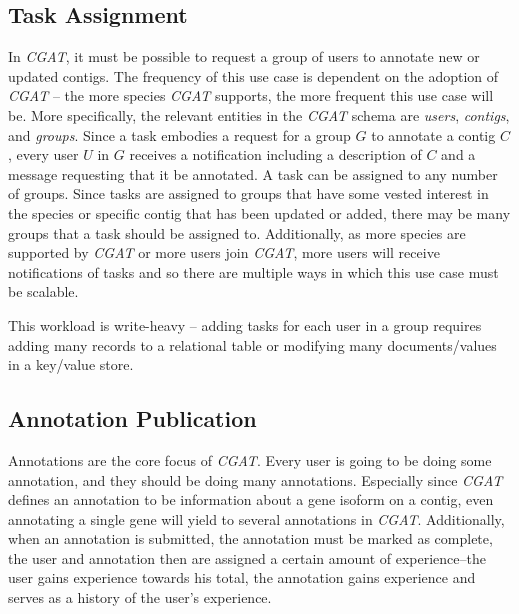 \documentclass[]{IEEEtran}
\begin{document}
\subsection{Task Assignment}
In \textit{CGAT}, it must be possible to request a group of users to annotate
new or updated contigs. The frequency of this use case is dependent on the
adoption of \textit{CGAT} -- the more species \textit{CGAT} supports, the more
frequent this use case will be. More specifically, the relevant entities in the
\textit{CGAT} schema are \textit{users}, \textit{contigs}, and \textit{groups}.
Since a task embodies a request for a group $G$ to annotate a contig $C$, every
user $U$ in $G$ receives a notification including a description of $C$ and a
message requesting that it be annotated. A task can be assigned to any number
of groups. Since tasks are assigned to groups that have some vested interest in
the species or specific contig that has been updated or added, there may be
many groups that a task should be assigned to. Additionally, as more species
are supported by \textit{CGAT} or more users join \textit{CGAT}, more users
will receive notifications of tasks and so there are multiple ways in which
this use case must be scalable.

This workload is write-heavy -- adding tasks for each user in a group requires
adding many records to a relational table or modifying many documents/values
in a key/value store.

\subsection{Annotation Publication}
Annotations are the core focus of \textit{CGAT}. Every user is going to be
doing some annotation, and they should be doing many annotations. Especially
since \textit{CGAT} defines an annotation to be information about a gene
isoform on a contig, even annotating a single gene will yield to several
annotations in \textit{CGAT}. Additionally, when an annotation is submitted,
the annotation must be marked as complete, the user and annotation then are
assigned a certain amount of experience--the user gains experience towards
his total, the annotation gains experience and serves as a history of the
user's experience.
\end{document}

